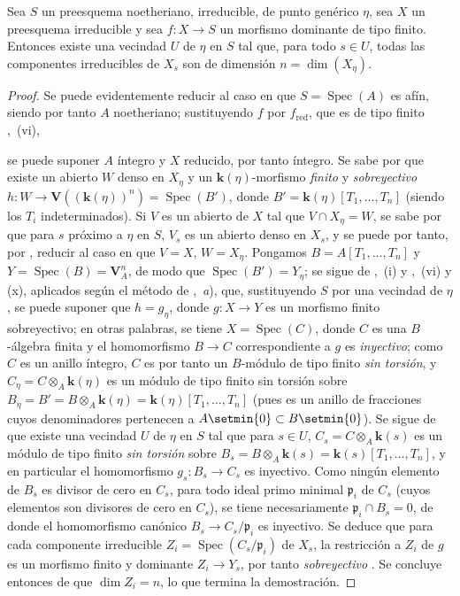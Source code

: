 \begin{corollary}[9.5.6]
\label{IV.9.5.6}
Sea $S$ un preesquema noetheriano, irreducible, de punto genérico $\eta$, sea $X$ un preesquema irreducible y sea $f:X\to S$ un morfismo dominante de tipo finito.
Entonces existe una vecindad $U$ de $\eta$ en $S$ tal que, para todo $s\in U$, todas las componentes irreducibles de $X_s$ son de dimensión $n=\dim(X_\eta)$.
\end{corollary}

\begin{proof}
Se puede evidentemente reducir al caso en que $S=\operatorname{Spec}(A)$ es afín, siendo por tanto $A$ noetheriano; sustituyendo $f$ por $f_{\mathrm{red}}$, que es de tipo finito ,~(vi),


se puede suponer $A$ íntegro y $X$ reducido, por tanto íntegro.
Se sabe por  que existe un abierto $W$ denso en $X_\eta$ y un $\boldsymbol{k}(\eta)$-morfismo \emph{finito} y \emph{sobreyectivo} $h:W\to\mathbf V((\boldsymbol{k}(\eta))^n)=\operatorname{Spec}(B')$, donde $B'=\boldsymbol{k}(\eta)[T_1,\ldots,T_n]$ (siendo los $T_i$ indeterminados).
Si $V$ es un abierto de $X$ tal que $V\cap X_\eta=W$, se sabe por  que para $s$ próximo a $\eta$ en $S$, $V_s$ es un abierto denso en $X_s$, y se puede por tanto, por , reducir al caso en que $V=X$, $W=X_\eta$.
Pongamos $B=A[T_1,\ldots,T_n]$ y $Y=\operatorname{Spec}(B)=\mathbf V_A^n$, de modo que $\operatorname{Spec}(B')=Y_\eta$; se sigue de ,~(i) y ,~(vi) y (x), aplicados según el método de ,~\emph{a}), que, sustituyendo $S$ por una vecindad de $\eta$, se puede suponer que $h=g_\eta$, donde $g:X\to Y$ es un morfismo finito sobreyectivo; en otras palabras, se tiene $X=\operatorname{Spec}(C)$, donde $C$ es una $B$-álgebra finita y el homomorfismo $B\to C$ correspondiente a $g$ es \emph{inyectivo}; como $C$ es un anillo íntegro, $C$ es por tanto un $B$-módulo de tipo finito \emph{sin torsión}, y $C_\eta=C\otimes_A \boldsymbol{k}(\eta)$ es un módulo de tipo finito sin torsión sobre $B_\eta=B'=B\otimes_A \boldsymbol{k}(\eta)=\boldsymbol{k}(\eta)[T_1,\ldots,T_n]$ (pues es un anillo de fracciones cuyos denominadores pertenecen a $A\setmin\{0\}\subset B\setmin\{0\}$).
Se sigue de  que existe una vecindad $U$ de $\eta$ en $S$ tal que para $s\in U$, $C_s=C\otimes_A \boldsymbol{k}(s)$ es un módulo de tipo finito \emph{sin torsión} sobre $B_s=B\otimes_A \boldsymbol{k}(s)=\boldsymbol{k}(s)[T_1,\ldots,T_n]$, y en particular el homomorfismo $g_s:B_s\to C_s$ es inyectivo.
Como ningún elemento de $B_s$ es divisor de cero en $C_s$, para todo ideal primo minimal $\mathfrak p_i$ de $C_s$ (cuyos elementos son divisores de cero en $C_s$), se tiene necesariamente $\mathfrak p_i\cap B_s=0$, de donde el homomorfismo canónico $B_s\to C_s/\mathfrak p_i$ es inyectivo.
Se deduce que para cada componente irreducible $Z_i=\operatorname{Spec}(C_s/\mathfrak p_i)$ de $X_s$, la restricción a $Z_i$ de $g$ es un morfismo finito y dominante $Z_i\to Y_s$, por tanto \emph{sobreyectivo} .
Se concluye entonces de  que $\dim Z_i=n$, lo que termina la demostración.
\end{proof}


